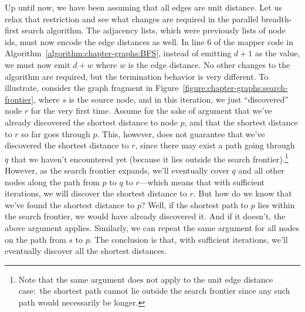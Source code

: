 Up until now, we have been assuming that all edges are unit distance.
Let us relax that restriction and see what changes are required in the
parallel breadth-first search algorithm.  The adjacency lists, which
were previously lists of node ids, must now encode the edge distances
as well.  In line 6 of the mapper code in
Algorithm~\ref{algorithm:chapter-graphs:BFS}, instead of emitting $d+1$ as
the value, we must now emit $d+w$ where $w$ is the edge distance.  No
other changes to the algorithm are required, but the termination
behavior is very different.  To illustrate, consider the graph
fragment in Figure~\ref{figure:chapter-graphs:search-frontier}, where
$s$ is the source node, and in this iteration, we just ``discovered''
node $r$ for the very first time.  Assume for the sake of argument
that we've already discovered the shortest distance to node $p$, and
that the shortest distance to $r$ so far goes through $p$.  This,
however, does not guarantee that we've discovered the shortest
distance to $r$, since there may exist a path going through $q$ that
we haven't encountered yet (because it lies outside the search
frontier).\footnote{Note that the same argument does not apply to the
  unit edge distance case:\ the shortest path cannot lie outside the
  search frontier since any such path would necessarily be longer.}
However, as the search frontier expands, we'll eventually cover $q$
and all other nodes along the path from $p$ to $q$ to $r$---which
means that with sufficient iterations, we will discover the shortest
distance to $r$.  But how do we know that we've found the shortest
distance to $p$?  Well, if the shortest path to $p$ lies within the
search frontier, we would have already discovered it.  And if it
doesn't, the above argument applies.  Similarly, we can repeat the
same argument for all nodes on the path from $s$ to $p$.  The
conclusion is that, with sufficient iterations, we'll eventually
discover all the shortest distances.

